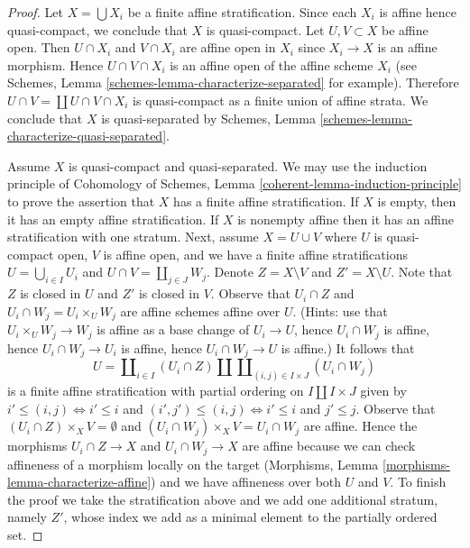 \documentclass[10pt,a4paper]{amsart}
\theoremstyle{plain}
\theoremstyle{definition}
\theoremstyle{remark}
\numberwithin{equation}{subsection}
\begin{document}
\begin{proof}
Let $X = \bigcup X_i$ be a finite affine stratification. Since each $X_i$
is affine hence quasi-compact, we conclude that $X$ is quasi-compact.
Let $U, V \subset X$ be affine open. Then $U \cap X_i$ and $V \cap X_i$
are affine open in $X_i$ since $X_i \to X$ is an affine morphism. Hence
$U \cap V \cap X_i$ is an affine open of the affine scheme $X_i$ (see
Schemes, Lemma \ref{schemes-lemma-characterize-separated} for example).
Therefore $U \cap V = \coprod U \cap V \cap X_i$ is quasi-compact
as a finite union of affine strata. We conclude that $X$ is
quasi-separated by Schemes, Lemma
\ref{schemes-lemma-characterize-quasi-separated}.

\medskip\noindent
Assume $X$ is quasi-compact and quasi-separated. We may use the
induction principle of
Cohomology of Schemes, Lemma \ref{coherent-lemma-induction-principle}
to prove the assertion that $X$ has a finite affine stratification.
If $X$ is empty, then it has an empty affine stratification.
If $X$ is nonempty affine then it has an affine stratification
with one stratum. Next, assume $X = U \cup V$ where $U$ is quasi-compact open,
$V$ is affine open, and we have a finite affine stratifications
$U = \bigcup_{i \in I} U_i$ and $U \cap V = \coprod_{j \in J} W_j$.
Denote $Z = X \setminus V$ and $Z' = X \setminus U$.
Note that $Z$ is closed in $U$ and $Z'$ is closed in $V$.
Observe that $U_i \cap Z$ and $U_i \cap W_j = U_i \times_U W_j$ are affine
schemes affine over $U$. (Hints: use that $U_i \times_U W_j \to W_j$ is
affine as a base change of $U_i \to U$, hence $U_i \cap W_j$ is affine,
hence $U_i \cap W_j \to U_i$ is affine, hence $U_i \cap W_j \to U$ is affine.)
It follows that
$$
U = \coprod\nolimits_{i \in I} (U_i \cap Z) \amalg
\coprod\nolimits_{(i, j) \in I \times J} (U_i \cap W_j)
$$
is a finite affine stratification with partial ordering on
$I \amalg I \times J$ given by $i' \leq (i, j) \Leftrightarrow i' \leq i$
and $(i', j') \leq (i, j) \Leftrightarrow i' \leq i$ and $j' \leq j$.
Observe that $(U_i \cap Z) \times_X V = \emptyset$ and
$(U_i \cap W_j) \times_X V = U_i \cap W_j$ are affine.
Hence the morphisms $U_i \cap Z \to X$ and $U_i \cap W_j \to X$
are affine because we can check affineness of a morphism
locally on the target
(Morphisms, Lemma \ref{morphisms-lemma-characterize-affine})
and we have affineness over both $U$ and $V$.
To finish the proof we take the stratification above
and we add one additional stratum, namely $Z'$,
whose index we add as a minimal element to the partially ordered set.
\end{proof}
\end{document}
